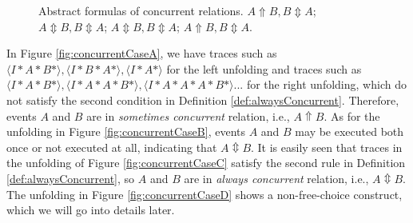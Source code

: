 \documentclass[dvips,...]{llncs}
\begin{document}
\begin{figure}[htbp]
{\begin{minipage}[b]{0.3\textwidth}
	\end{minipage}
	\label{fig:concurrentCaseC}
}
\caption{Abstract formulas of concurrent relations.  $A\Uparrow B,B\Updownarrow A$;  $A\Updownarrow B,B\Updownarrow A$;  $A\Updownarrow B,B\Updownarrow A$;  $A\Uparrow B,B\Updownarrow A$.\label{fig:concurrentCases}}
\end{figure}

In Figure \ref{fig:concurrentCaseA}, we have traces such as $\langle I*A*B*\rangle ,\langle I*B*A*\rangle ,\langle I*A*\rangle $ for the left unfolding and traces such as $\langle I*A*B*\rangle ,\langle I*A*A*B*\rangle ,\langle I*A*A*A*B*\rangle ...$ for the right unfolding, which do not satisfy the second condition in Definition \ref{def:alwaysConcurrent}. Therefore, events $A$ and $B$ are in \textit{sometimes concurrent} relation, i.e., $A\Uparrow B$. As for the unfolding in Figure \ref{fig:concurrentCaseB}, events $A$ and $B$ may be executed both once or not executed at all, indicating that $A\Updownarrow B$. It is easily seen that traces in the unfolding of Figure \ref{fig:concurrentCaseC} satisfy the second rule in Definition \ref{def:alwaysConcurrent}, so $A$ and $B$ are in \textit{always concurrent} relation, i.e., $A\Updownarrow B$. The unfolding in Figure \ref{fig:concurrentCaseD} shows a non-free-choice construct, which we will go into details later.
\end{document}
